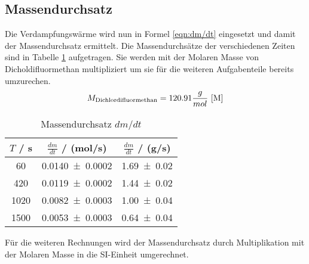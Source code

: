 \subsection{Massendurchsatz}
Die Verdampfungswärme wird nun in Formel \ref{eqn:dm/dt} eingesetzt und damit der Massendurchsatz ermittelt. Die Massendurchsätze der verschiedenen Zeiten sind in Tabelle \ref{tab:dm/dt} aufgetragen. Sie werden mit der Molaren Masse von Dicholdifluormethan multipliziert um sie für die weiteren Aufgabenteile bereits umzurechen. 
\begin{equation}
  M_{\text{Dichlordifluormethan}} = 120.91 \frac{g}{mol} \ \text{\cite{M}}
\end{equation}
\begin{table}
  \centering
  \begin{tabular}{c c c}
    \toprule
    $T$ / s & $\frac{dm}{dt}$ / (mol/s) & $\frac{dm}{dt}$ / (g/s) \\
    \midrule
    60   & \num{0.0140 +- 0.0002} & \num{1.69 +- 0.02}\\
    420  & \num{0.0119 +- 0.0002} & \num{1.44 +- 0.02}\\
    1020 & \num{0.0082 +- 0.0003} & \num{1.00 +- 0.04}\\
    1500 & \num{0.0053 +- 0.0003} & \num{0.64 +- 0.04}\\
    \bottomrule
  \end{tabular}
  \caption{Massendurchsatz $dm/dt$}
  \label{tab:dm/dt}
\end{table}
Für die weiteren Rechnungen wird der Massendurchsatz durch Multiplikation mit der Molaren Masse in die SI-Einheit umgerechnet.
